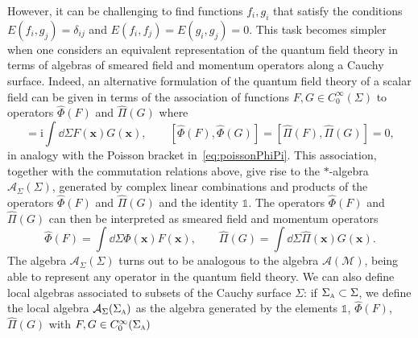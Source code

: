 \documentclass[letterpaper,12pt,titlepage,oneside,final]{book}
\newcommand{\openone}{\mathds{1}}
\newcommand{\M}{\mathcal{M}}
\newcommand{\ii}{\mathrm{i}}
\newcommand{\tc}[1]{\textsc{#1}}
\begin{document}
However, it can be challenging to find functions $f_i, g_i$ that satisfy the conditions $E(f_i,g_j) = \delta_{ij}$ and $E(f_i,f_j) = E(g_i,g_j) = 0$. This task becomes simpler when one considers an equivalent representation of the quantum field theory in terms of algebras of smeared field and momentum operators along a Cauchy surface. Indeed, an alternative formulation of the quantum field theory of a scalar field can be given in terms of the association of functions $F,G\in C_0^\infty(\Sigma)$ to operators
$\hat{\Phi}(F)$ and $\hat{\Pi}(G)$
where
\begin{equation}
    [\hat{\Phi}(F),\hat{\Pi}(G)] = \ii \int \dd \Sigma F(\bm x)G(\bm x), \quad\quad [\hat{\Phi}(F),\hat{\Phi}(G)] = [\hat{\Pi}(F),\hat{\Pi}(G)] = 0,
\end{equation}
in analogy with the Poisson bracket in~\eqref{eq:poissonPhiPi}. This association, together with the commutation relations above, give rise to the $\ast$-algebra $\mathcal{A}_\Sigma(\Sigma)$, generated by complex linear combinations and products of the operators $\hat{\Phi}(F)$ and $\hat{\Pi}(G)$ and the identity $\openone$. The operators $\hat{\Phi}(F)$ and $\hat{\Pi}(G)$ can then be interpreted as smeared field and momentum operators
\begin{equation}
    \hat{\Phi}(F) = \int \dd \Sigma \hat{\Phi}(\bm x) F(\bm x), \quad \quad \hat{\Pi}(G) = \int \dd \Sigma \hat{\Pi}(\bm x) G(\bm x).
\end{equation}
The algebra $\mathcal{A}_\Sigma(\Sigma)$ turns out to be analogous to the algebra $\mathcal{A}(\M)$, being able to represent any operator in the quantum field theory. We can also define local algebras associated to subsets of the Cauchy surface $\Sigma$: if $\Sigma_\tc{a}\subset \Sigma$, we define the local algebra $\mathcal{A}_\Sigma(\Sigma_\tc{a})$ as the algebra generated by the elements $\openone$, $\hat{\Phi}(F)$, $\hat{\Pi}(G)$ with $F,G\in C_0^\infty(\Sigma_\tc{a})$
\end{document}
